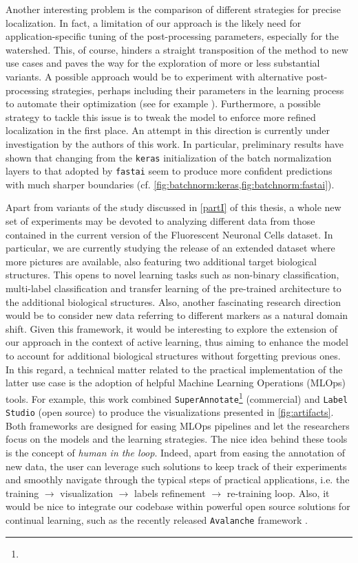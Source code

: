Another interesting problem is the comparison of different strategies for precise localization. In fact, a limitation of our approach is the likely need for application-specific tuning of the post-processing parameters, especially for the watershed.
This, of course, hinders a straight transposition of the method to new use cases and paves the way for the exploration of more or less substantial variants.
A possible approach would be to experiment with alternative post-processing strategies, perhaps including their parameters in the learning process to automate their optimization (see for example \cite{wolf2017learned}).
Furthermore, a possible strategy to tackle this issue is to tweak the model to enforce more refined localization in the first place.
An attempt in this direction is currently under investigation by the authors of this work.
In particular, preliminary results have shown that changing from the \texttt{keras} initialization of the batch normalization layers to that adopted by \texttt{fastai} seem to produce more confident predictions with much sharper boundaries (cf. \cref{fig:batchnorm:keras,fig:batchnorm:fastai}).

Apart from variants of the study discussed in \cref{partI} of this thesis, a whole new set of experiments may be devoted to analyzing different data from those contained in the current version of the Fluorescent Neuronal Cells dataset.
In particular, we are currently studying the release of an extended dataset where more pictures are available, also featuring two additional target biological structures.
This opens to novel learning tasks such as non-binary classification, multi-label classification and transfer learning of the pre-trained architecture to the additional biological structures.
Also, another fascinating research direction would be to consider new data referring to different markers as a natural domain shift. Given this framework, it would be interesting to explore the extension of our approach in the context of active learning, thus aiming to enhance the model to account for additional biological structures without forgetting previous ones.
In this regard, a technical matter related to the practical implementation of the latter use case is the adoption of helpful Machine Learning Operations (MLOps) tools.
For example, this work combined \texttt{SuperAnnotate}\footnote{\superannotate} (commercial) and \texttt{Label Studio} (open source) \cite{labelstudio} to produce the visualizations presented in \cref{fig:artifacts}. Both frameworks are designed for easing MLOps pipelines and let the researchers focus on the models and the learning strategies.
The nice idea behind these tools is the concept of \textit{human in the loop}. 
Indeed, apart from easing the annotation of new data, the user can leverage such solutions to keep track of their experiments and smoothly navigate through the typical steps of practical applications, i.e. the training $\longrightarrow$ visualization $\longrightarrow$ labels refinement $\longrightarrow$ re-training loop.
Also, it would be nice to integrate our codebase within powerful open source solutions for continual learning, such as the recently released \texttt{Avalanche} framework \cite{lomonaco2021avalanche}.


